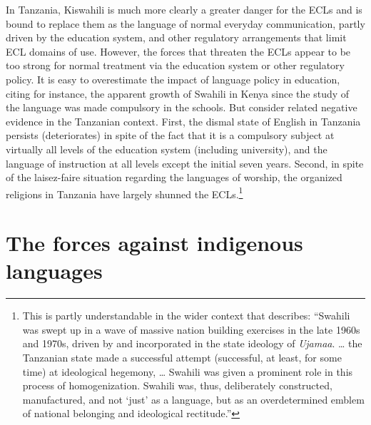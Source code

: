 \documentclass[output=paper,colorlinks,citecolor=brown]{langscibook}
\begin{document}
In Tanzania, Kiswahili is much more clearly a greater danger for the ECLs and is bound to replace them as the language of normal everyday communication, partly driven by the education system, and other regulatory arrangements that limit ECL domains of use. However, the forces that threaten the ECLs appear to be too strong for normal treatment via the education system or other regulatory policy. It is easy to overestimate the impact of language policy in education, citing for instance, the apparent growth of Swahili in Kenya since the study of the language was made compulsory in the schools. But consider related negative evidence in the Tanzanian context. First, the dismal state of English in Tanzania persists (deteriorates) in spite of the fact that it is a compulsory subject at virtually all levels of the education system (including university), and the language of instruction at all levels except the initial seven years. Second, in spite of the laisez-faire situation regarding the languages of worship, the organized religions in Tanzania have largely shunned the ECLs.\footnote{This is partly understandable in the wider context that \citet[8]{Blommaert2014} describes: “Swahili was swept up in a wave of massive nation building exercises in the late 1960s and 1970s, driven by and incorporated in the state ideology of \textit{Ujamaa}.  … the Tanzanian state made a successful attempt (successful, at least, for some time) at ideological hegemony, … Swahili was given a prominent role in this process of homogenization. Swahili was, thus, deliberately constructed, manufactured, and not ‘just’ as a language, but as an overdetermined emblem of national belonging and ideological rectitude.”}

\section{The forces against indigenous languages}\label{sec:kioko:6}
\end{document}
